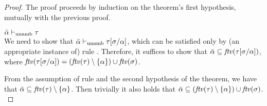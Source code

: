 {\centering
{}}
\begin{proof}
The proof proceeds by induction on the theorem's first hypothesis, mutually with the previous
proof.\\

\item[\fbox{\rref{UA-Simp}}]\quad${\bar{\alpha} \vdash_{\mathrm{unamb}} \tau}$\\

We need to show that ${\bar\alpha \vdash_{\mathrm{unamb}} \tau[\sigma/\alpha]}$, which can be satisfied only
by (an appropriate instance of) rule . Therefore, it suffices to show that
$\bar\alpha\subseteq{\it ftv }(\tau[\sigma/\alpha])$, where
${\it ftv }(\tau[\sigma/\alpha]) = ({\it ftv }(\tau)\setminus\{\alpha\})\cup{\it ftv }(\sigma)$.


From the assumption of rule  and the second hypothesis of the theorem,
we have that $\bar\alpha\subseteq{\it ftv }(\tau)\setminus\{\alpha\}$. Then trivially it also
holds that $\bar\alpha\subseteq({\it ftv }(\tau)\setminus\{\alpha\})\cup{\it ftv }(\sigma)$.\\


\end{proof}
